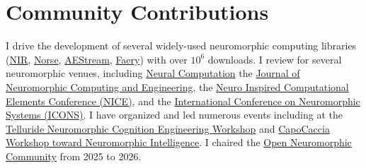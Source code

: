 \documentclass[11pt, a4paper]{article}
\newcommand{\years}[1]{\marginnote{\scriptsize #1}}
\begin{document}
\section*{Community Contributions}
I drive the development of several widely-used neuromorphic computing libraries (\href{https://github.com/neuromorphs/NIR}{NIR}, \href{https://github.com/norse/}{Norse}, \href{https://github.com/aestream}{AEStream}, \href{https://github.com/aestream/faery}{Faery}) with over $10^6$ downloads.
I review for several neuromorphic venues, including \href{https://direct.mit.edu/neco}{Neural Computation} the \href{https://iopscience.iop.org/journal/2634-4386}{Journal of Neuromorphic Computing and Engineering}, the \href{https://niceworkshop.org/}{Neuro Inspired Computational Elements Conference (NICE)}, and the \href{https://iconsneuromorphic.cc/}{International Conference on Neuromorphic Systems (ICONS)}.
I have organized and led numerous events including at the \href{https://sites.google.com/view/telluride-2024/}{Telluride Neuromorphic Cognition Engineering Workshop} and \href{https://capocaccia.cc/en/}{CapoCaccia Workshop toward Neuromorphic Intelligence}.
I chaired the \href{https://open-neuromorphic.org/}{Open Neuromorphic Community} from 2025 to 2026.
\end{document}
